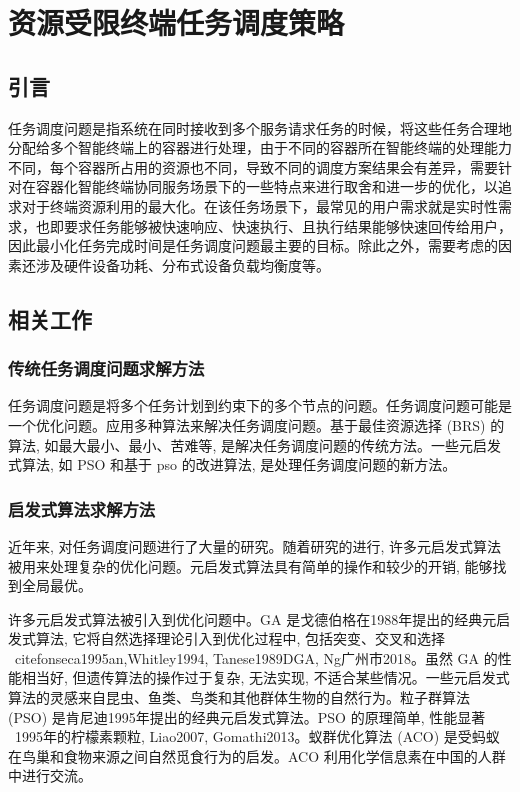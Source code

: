 \chapter{资源受限终端任务调度策略}\label{chap:task_scheduling}

\section{引言}

任务调度问题是指系统在同时接收到多个服务请求任务的时候，将这些任务合理地分配给多个智能终端上的容器进行处理，由于不同的容器所在智能终端的处理能力不同，每个容器所占用的资源也不同，导致不同的调度方案结果会有差异，需要针对在容器化智能终端协同服务场景下的一些特点来进行取舍和进一步的优化，以追求对于终端资源利用的最大化。在该任务场景下，最常见的用户需求就是实时性需求，也即要求任务能够被快速响应、快速执行、且执行结果能够快速回传给用户，因此最小化任务完成时间是任务调度问题最主要的目标。除此之外，需要考虑的因素还涉及硬件设备功耗、分布式设备负载均衡度等。

\section{相关工作}

\subsection{传统任务调度问题求解方法}

任务调度问题是将多个任务计划到约束下的多个节点的问题。任务调度问题可能是一个优化问题。应用多种算法来解决任务调度问题。基于最佳资源选择 (BRS) 的算法, 如最大最小、最小、苦难等, 是解决任务调度问题的传统方法。一些元启发式算法, 如 PSO 和基于 pso 的改进算法, 是处理任务调度问题的新方法。

\subsection{启发式算法求解方法}

近年来, 对任务调度问题进行了大量的研究。随着研究的进行, 许多元启发式算法被用来处理复杂的优化问题。元启发式算法具有简单的操作和较少的开销, 能够找到全局最优。

许多元启发式算法被引入到优化问题中。GA 是戈德伯格在1988年提出的经典元启发式算法, 它将自然选择理论引入到优化过程中, 包括突变、交叉和选择 \ citefonseca1995an,Whitley1994, Tanese1989DGA, Ng广州市2018。虽然 GA 的性能相当好, 但遗传算法的操作过于复杂, 无法实现, 不适合某些情况。一些元启发式算法的灵感来自昆虫、鱼类、鸟类和其他群体生物的自然行为。粒子群算法 (PSO) 是肯尼迪1995年提出的经典元启发式算法。PSO 的原理简单, 性能显著 \ 1995年的柠檬素颗粒, Liao2007, Gomathi2013。蚁群优化算法 (ACO) 是受蚂蚁在鸟巢和食物来源之间自然觅食行为的启发。ACO 利用化学信息素在中国的人群中进行交流。

